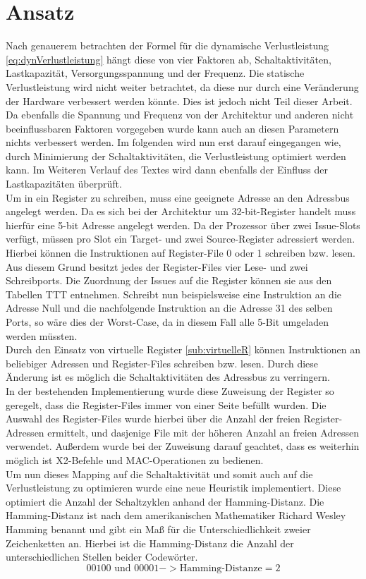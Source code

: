 \section{Ansatz}
Nach genauerem betrachten der Formel für die dynamische Verlustleistung \ref{eq:dynVerlustleistung} hängt diese von vier Faktoren ab, Schaltaktivitäten,  Lastkapazität, Versorgungsspannung und der Frequenz. Die statische Verlustleistung wird nicht weiter betrachtet, da diese nur durch eine Veränderung der Hardware verbessert werden könnte. Dies ist jedoch nicht Teil dieser Arbeit. Da ebenfalls die Spannung und Frequenz von der Architektur und anderen nicht beeinflussbaren Faktoren vorgegeben wurde kann auch an diesen Parametern nichts verbessert werden. Im folgenden wird nun erst darauf eingegangen wie, durch Minimierung der Schaltaktivitäten, die Verlustleistung optimiert werden kann. Im Weiteren Verlauf des Textes wird dann ebenfalls der Einfluss der Lastkapazitäten überprüft.\\
Um in ein Register zu schreiben, muss eine geeignete Adresse an den Adressbus angelegt werden. Da es sich bei der Architektur um 32-bit-Register handelt muss hierfür eine 5-bit Adresse angelegt werden.
Da der Prozessor über zwei Issue-Slots verfügt, müssen pro Slot ein Target- und zwei Source-Register adressiert werden. Hierbei können die Instruktionen auf Register-File 0 oder 1 schreiben bzw. lesen. Aus diesem Grund besitzt jedes der Register-Files vier Lese- und zwei Schreibports. Die Zuordnung der Issues auf die Register können sie aus den Tabellen TTT entnehmen. Schreibt nun beispielsweise eine Instruktion an die Adresse Null und die nachfolgende Instruktion an die Adresse 31 des selben Ports, so wäre dies der Worst-Case, da in diesem Fall alle 5-Bit umgeladen werden müssten.\\
Durch den Einsatz von virtuelle Register \ref{sub:virtuelleR} können Instruktionen an beliebiger Adressen und Register-Files schreiben bzw. lesen. Durch diese Änderung ist es möglich die Schaltaktivitäten des Adressbus zu verringern.\\
In der bestehenden Implementierung wurde diese Zuweisung der Register so geregelt, dass die Register-Files immer von einer Seite befüllt wurden. Die Auswahl des Register-Files wurde hierbei über die Anzahl der freien Register-Adressen ermittelt, und dasjenige File mit der höheren Anzahl an freien Adressen verwendet. Außerdem wurde bei der Zuweisung darauf geachtet, dass es weiterhin möglich ist X2-Befehle und MAC-Operationen zu bedienen.\\
Um nun dieses Mapping auf die Schaltaktivität und somit auch auf die Verlustleistung zu optimieren wurde eine neue Heuristik implementiert.
Diese optimiert die Anzahl der Schaltzyklen anhand der Hamming-Distanz.
Die Hamming-Distanz ist nach dem amerikanischen Mathematiker Richard Wesley Hamming benannt und gibt ein Maß für die Unterschiedlichkeit zweier Zeichenketten an. Hierbei ist die Hamming-Distanz die Anzahl der unterschiedlichen Stellen beider Codewörter.
\begin{equation}
00100 \text{ und } 00001 -> \text{Hamming-Distanze}= 2
\label{eq:hammingdistanze}
\end{equation}
 
